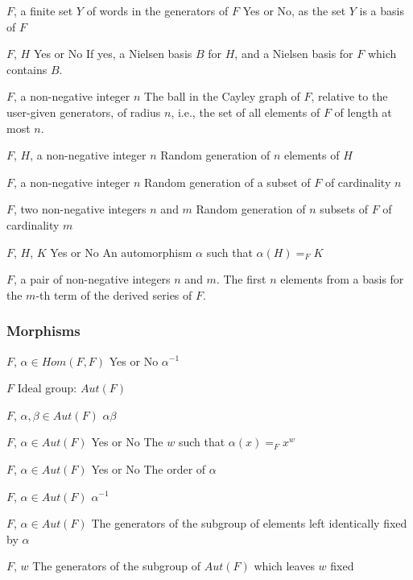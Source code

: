 \begin{enumerate}
{$F$, a finite set $Y$ of words in the generators of $F$}
{Yes or No, as the set $Y$ is a basis of $F$}

{$F$, $H$}
{Yes or No}
{If yes, a Nielsen basis $B$ for $H$, and a Nielsen basis for
$F$ which contains $B$.
}

{$F$, a non-negative integer $n$}
{The ball in the Cayley graph of $F$, relative to the user-given generators, of
radius $n$, i.e., the set of all elements of $F$ of length at most $n$.
}

{$F$, $H$, a non-negative integer $n$}
{Random generation of $n$ elements of $H$}

{$F$, a non-negative integer $n$}
{Random generation of a subset of $F$ of cardinality $n$}

{$F$, two non-negative integers $n$ and $m$}
{Random generation of $n$ subsets of $F$ of cardinality $m$}

{$F$, $H$, $K$}
{Yes or No}
{An automorphism $\alpha$ such that $\alpha(H)=_F K$}

{$F$, a pair of non-negative integers $n$ and $m$.}
{The first $n$ elements from a basis for the $m$-th term of
the derived series of $F$.
}

\end{enumerate}


\subsubsection{Morphisms}

\begin{enumerate}

{$F$, $\alpha\in Hom(F,F)$}
{Yes or No}
{$\alpha^{-1}$}

{$F$}
{Ideal group: $Aut(F)$}

{$F$, $\alpha, \beta\in Aut(F)$}
{$\alpha\beta$}

{$F$, $\alpha\in Aut(F)$}
{Yes or No}
{The $w$ such that $\alpha(x)=_F x^w$}

{$F$, $\alpha\in Aut(F)$}
{Yes or No}
{The order of $\alpha$}

{$F$, $\alpha\in Aut(F)$}
{$\alpha^{-1}$}

{$F$, $\alpha\in Aut(F)$}
{The generators of the subgroup of elements left
identically fixed by $\alpha$
}

{$F$, $w$}
{The generators of the subgroup of $Aut(F)$ which leaves $w$ fixed}

\end{enumerate}
